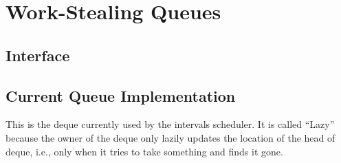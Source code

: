 
\chapter{Work-Stealing Queues}
\label{chap:queues-description}

\section{Interface}
\label{sec:queues-description-interface}




\section{Current Queue Implementation}
\label{sec:queues-description-current-implementation}

This is the deque currently used by the intervals scheduler. It is
called ``Lazy'' because the owner of the deque only lazily updates the
location of the head of deque, i.e., only when it tries to take
something and finds it gone.


    
      
    
    
    


